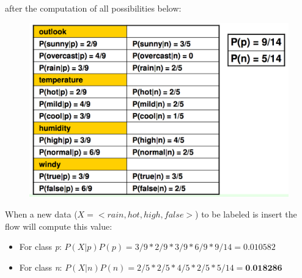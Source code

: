 \documentclass[12pt]{article}
\begin{document}
after the computation of all possibilities below:
\begin{figure}[H]
  \centering
  \includegraphics[width=0.8\linewidth]{images/bay_comp.png}
  \label{fig:bay_comp}
\end{figure}
When a new data ($X = <rain, hot, high, false>$) to be labeled is insert the flow will compute this value:
\begin{itemize}
  \item For class \textit{p}: $P(X|p)P(p) = 3/9*2/9*3/9*6/9*9/14 = 0.010582$
  \item For class \textit{n}: $P(X|n)P(n) = 2/5*2/5*4/5*2/5*5/14 = \textbf{0.018286}$
\end{itemize}
\end{document}
